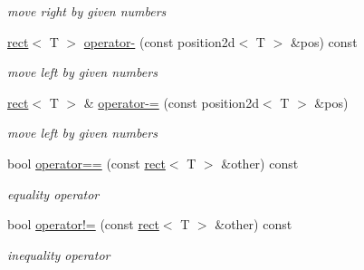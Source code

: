 \begin{DoxyCompactItemize}
\begin{DoxyCompactList}\small\item\em move right by given numbers \end{DoxyCompactList}\item 
\mbox{\label{classirr_1_1core_1_1rect_ae65c0f6e91a4d575eb3d332ce571a416}} 
\hyperlink{classirr_1_1core_1_1rect}{rect}$<$ T $>$ \hyperlink{classirr_1_1core_1_1rect_ae65c0f6e91a4d575eb3d332ce571a416}{operator-\/} (const position2d$<$ T $>$ \&pos) const
\begin{DoxyCompactList}\small\item\em move left by given numbers \end{DoxyCompactList}\item 
\mbox{\label{classirr_1_1core_1_1rect_a3ef4f6f13ec79c3d5745df3a76f9e1e1}} 
\hyperlink{classirr_1_1core_1_1rect}{rect}$<$ T $>$ \& \hyperlink{classirr_1_1core_1_1rect_a3ef4f6f13ec79c3d5745df3a76f9e1e1}{operator-\/=} (const position2d$<$ T $>$ \&pos)
\begin{DoxyCompactList}\small\item\em move left by given numbers \end{DoxyCompactList}\item 
\mbox{\label{classirr_1_1core_1_1rect_a2753c5716b6618caff8c6b7aded30c90}} 
bool \hyperlink{classirr_1_1core_1_1rect_a2753c5716b6618caff8c6b7aded30c90}{operator==} (const \hyperlink{classirr_1_1core_1_1rect}{rect}$<$ T $>$ \&other) const
\begin{DoxyCompactList}\small\item\em equality operator \end{DoxyCompactList}\item 
\mbox{\label{classirr_1_1core_1_1rect_ad5ffad1c869006645af9a10e8bc7b905}} 
bool \hyperlink{classirr_1_1core_1_1rect_ad5ffad1c869006645af9a10e8bc7b905}{operator!=} (const \hyperlink{classirr_1_1core_1_1rect}{rect}$<$ T $>$ \&other) const
\begin{DoxyCompactList}\small\item\em inequality operator \end{DoxyCompactList}\item 
\mbox{\label{classirr_1_1core_1_1rect_a8af20faabcbf8880c1846a16e604c921}} 

\end{DoxyCompactItemize}
